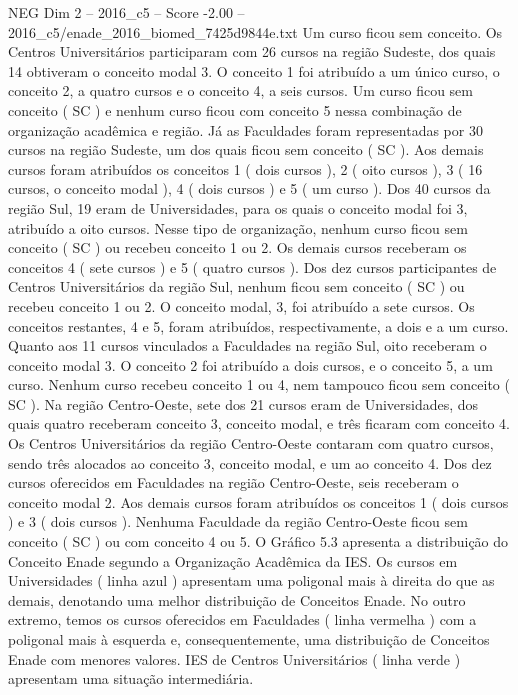 \begin{textsample}{NEG Dim 2 – 2016\_c5 – Score -2.00 – 2016\_c5/enade\_2016\_biomed\_7425d9844e.txt}
Um curso ficou sem conceito.
Os Centros Universitários participaram com 26 cursos na região Sudeste, dos quais 14 obtiveram o conceito modal 3.
O conceito 1 foi atribuído a um único curso, o conceito 2, a quatro cursos e o conceito 4, a seis cursos.
Um curso ficou sem conceito ( SC ) e nenhum curso ficou com conceito 5 nessa combinação de organização acadêmica e região.
Já as Faculdades foram representadas por 30 cursos na região Sudeste, um dos quais ficou sem conceito ( SC ).
Aos demais cursos foram atribuídos os conceitos 1 ( dois cursos ), 2 ( oito cursos ), 3 ( 16 cursos, o conceito modal ), 4 ( dois cursos ) e 5 ( um curso ).
Dos 40 cursos da região Sul, 19 eram de Universidades, para os quais o conceito modal foi 3, atribuído a oito cursos.
Nesse tipo de organização, nenhum curso ficou sem conceito ( SC ) ou recebeu conceito 1 ou 2.
Os demais cursos receberam os conceitos 4 ( sete cursos ) e 5 ( quatro cursos ).
Dos dez cursos participantes de Centros Universitários da região Sul, nenhum ficou sem conceito ( SC ) ou recebeu conceito 1 ou 2.
O conceito modal, 3, foi atribuído a sete cursos.
Os conceitos restantes, 4 e 5, foram atribuídos, respectivamente, a dois e a um curso.
Quanto aos 11 cursos vinculados a Faculdades na região Sul, oito receberam o conceito modal 3.
O conceito 2 foi atribuído a dois cursos, e o conceito 5, a um curso.
Nenhum curso recebeu conceito 1 ou 4, nem tampouco ficou sem conceito ( SC ).
Na região Centro-Oeste, sete dos 21 cursos eram de Universidades, dos quais quatro receberam conceito 3, conceito modal, e três ficaram com conceito 4.
Os Centros Universitários da região Centro-Oeste contaram com quatro cursos, sendo três alocados ao conceito 3, conceito modal, e um ao conceito 4.
Dos dez cursos oferecidos em Faculdades na região Centro-Oeste, seis receberam o conceito modal 2.
Aos demais cursos foram atribuídos os conceitos 1 ( dois cursos ) e 3 ( dois cursos ).
Nenhuma Faculdade da região Centro-Oeste ficou sem conceito ( SC ) ou com conceito 4 ou 5.
O Gráfico 5.3 apresenta a distribuição do Conceito Enade segundo a Organização Acadêmica da IES.
Os cursos em Universidades ( linha azul ) apresentam uma poligonal mais à direita do que as demais, denotando uma melhor distribuição de Conceitos Enade.
No outro extremo, temos os cursos oferecidos em Faculdades ( linha vermelha ) com a poligonal mais à esquerda e, consequentemente, uma distribuição de Conceitos Enade com menores valores.
IES de Centros Universitários ( linha verde ) apresentam uma situação intermediária.

\end{textsample}
